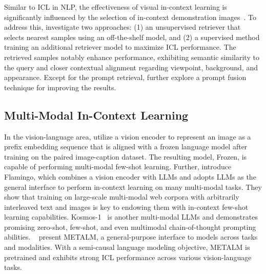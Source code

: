 

Similar to ICL in NLP, the effectiveness of visual in-context learning is significantly influenced by the selection of in-context demonstration images~\citep{zhang2023visual_icl_analysis,sun2023exploring_visual_icl}. 
To address this, \citet{zhang2023visual_icl_analysis} investigate two approaches: (1) an unsupervised retriever that selects nearest samples using an off-the-shelf model, and (2) a supervised method training an additional retriever model to maximize ICL performance. The retrieved samples notably enhance performance, exhibiting semantic similarity to the query and closer contextual alignment regarding viewpoint, background, and appearance.  Except for the prompt retrieval, \citet{sun2023exploring_visual_icl} further explore a prompt fusion technique for improving the results.




\subsection{Multi-Modal In-Context Learning}
In the vision-language area, \citet{tsimpoukelli2021frozen} utilize a vision encoder to represent an image as a prefix embedding sequence that is aligned with a frozen language model after training on the paired image-caption dataset.
The resulting model, Frozen, is capable of performing multi-modal few-shot learning. 
Further, \citet{alayrac2022flamingo} introduce
Flamingo, which 
combines a vision encoder with LLMs and adopts LLMs as the general interface to perform in-context learning on many multi-modal tasks.
They show that training on large-scale multi-modal web corpora with arbitrarily interleaved text and images is key to endowing them with in-context few-shot learning capabilities. 
Kosmos-1~\citep{huang2023kosmos} is another multi-modal LLMs and demonstrates promising zero-shot, few-shot,
and even multimodal chain-of-thought prompting abilities.
~\citet{hao2022language} present METALM, a general-purpose interface to models across tasks and modalities. With a semi-causal language modeling objective, METALM is pretrained and exhibits strong ICL performance across various vision-language tasks. 




